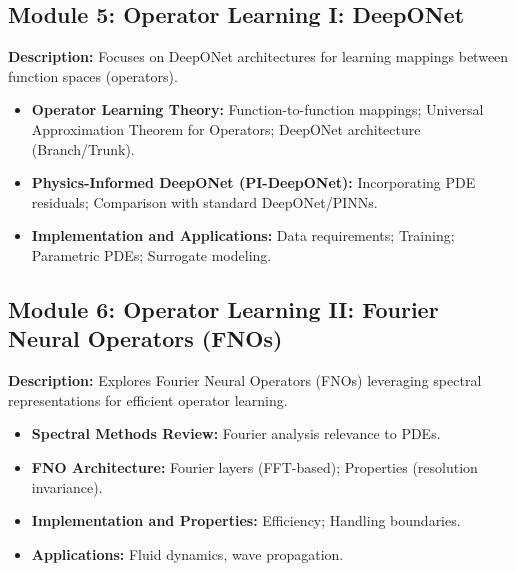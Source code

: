 \documentclass[11pt,fourier]{article}
\begin{document}
\subsection*{Module 5: Operator Learning I: DeepONet}
\textbf{Description:} Focuses on DeepONet architectures for learning mappings between function spaces (operators).
\begin{itemize}
    \item \textbf{Operator Learning Theory:} Function-to-function mappings; Universal Approximation Theorem for Operators; DeepONet architecture (Branch/Trunk).
    \item \textbf{Physics-Informed DeepONet (PI-DeepONet):} Incorporating PDE residuals; Comparison with standard DeepONet/PINNs.
    \item \textbf{Implementation and Applications:} Data requirements; Training; Parametric PDEs; Surrogate modeling.
\end{itemize}

\subsection*{Module 6: Operator Learning II: Fourier Neural Operators (FNOs)}
\textbf{Description:} Explores Fourier Neural Operators (FNOs) leveraging spectral representations for efficient operator learning.
\begin{itemize}
    \item \textbf{Spectral Methods Review:} Fourier analysis relevance to PDEs.
    \item \textbf{FNO Architecture:} Fourier layers (FFT-based); Properties (resolution invariance).
    \item \textbf{Implementation and Properties:} Efficiency; Handling boundaries.
    \item \textbf{Applications:} Fluid dynamics, wave propagation.
\end{itemize}
\end{document}
